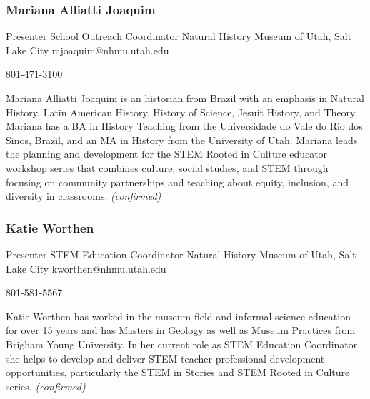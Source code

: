 \documentclass{report}
\begin{document}
              
                \subsubsection*{ Mariana Alliatti Joaquim }
                Presenter\newline
                School Outreach Coordinator\newline
                Natural History Museum of Utah, Salt Lake City
                \newline
                mjoaquim@nhmu.utah.edu\newline
                
                801-471-3100\newline

                Mariana Alliatti Joaquim is an historian from Brazil with an emphasis in Natural History, Latin American History, History of Science, Jesuit History, and Theory. Mariana has a BA in History Teaching from the Universidade do Vale do Rio dos Sinos, Brazil, and an MA in History from the University of Utah. Mariana leads the planning and development for the STEM Rooted in Culture educator workshop series that combines culture, social studies, and STEM through focusing on community partnerships and teaching about equity, inclusion, and diversity in classrooms.
                \emph{ (confirmed) }
              

              
                \subsubsection*{ Katie Worthen }
                Presenter\newline
                STEM Education Coordinator\newline
                Natural History Museum of Utah, Salt Lake City
                \newline
                kworthen@nhmu.utah.edu\newline
                
                801-581-5567\newline

                Katie Worthen has worked in the museum field and informal science education for over 15 years and has Masters in Geology as well as Museum Practices from Brigham Young University. In her current role as STEM Education Coordinator she helps to develop and deliver STEM teacher professional development opportunities, particularly the STEM in Stories and STEM Rooted in Culture series.
                \emph{ (confirmed) }
              
\end{document}
